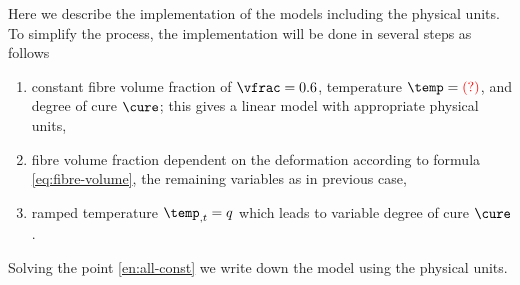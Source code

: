 \documentclass[twoside,a4paper,12pt,draft]{article}
\newcommand{\QM}{{\color{red}(?)}}
\newcommand{\QM}{}
\begin{document}
Here we describe the implementation of the models including the
physical units. To simplify the process, the implementation will be
done in several steps as follows
%
\begin{enumerate}
\item constant fibre volume fraction of $\vfrac = 0.6$, temperature $\temp=\QM$, and degree of cure $\cure$; this gives a linear model with appropriate physical units, \label{en:all-const}
\item fibre volume fraction dependent on the deformation according to formula \eqref{eq:fibre-volume}, the remaining variables as in previous case,
\item ramped temperature $\temp_{,t} = q$ which leads to variable degree of cure $\cure$.
\end{enumerate}

Solving the point \ref{en:all-const} we write down the model using the physical units.







\end{document}
